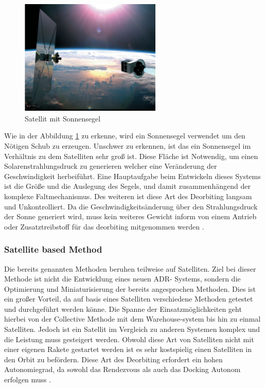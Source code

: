 	\begin{figure}[h]
			\centering
					\includegraphics[width=0.60\textwidth]{./graphics/ADR/Sonnensegel.PNG}
				\caption{Satellit mit Sonnensegel \cite{Romagnoli.2012}}
				\label{fig:Segel}
			\end{figure}

	
Wie in der Abbildung \ref{fig:Segel} zu erkenne, wird ein Sonnensegel verwendet um den Nötigen Schub zu erzeugen. Unschwer zu erkennen, ist das ein Sonnensegel im Verhältnis zu dem Satelliten sehr groß ist. Diese Fläche ist Notwendig, um einen Solarenstrahlungsdruck zu generieren welcher eine Veränderung der Geschwindigkeit herbeiführt. Eine Hauptaufgabe beim Entwickeln dieses Systems ist die Größe und die Auslegung des Segels, und damit zusammenhängend der komplexe Faltmechanismus. Des weiteren ist diese Art des Deorbiting langsam und Unkontrolliert. Da die Geschwindigkeitsänderung über den Strahlungsdruck der Sonne generiert wird, muss kein weiteres Gewicht inform von einem Antrieb oder Zusatztreibstoff für das deorbiting mitgenommen werden \cite{Romagnoli.2012,Mark.2019}.

\subsubsection{Satellite based Method}
	
	Die bereits genannten Methoden beruhen teilweise auf Satelliten. Ziel bei dieser Methode ist nicht die Entwicklung eines neuen ADR- Systems, sondern die Optimierung und Miniaturisierung der bereits angesprochen Methoden. Dies ist ein großer Vorteil, da auf basis eines Satelliten verschiedene Methoden getestet und durchgeführt werden könne. Die Spanne der Einsatzmöglichkeiten geht hierbei von der Collective Methode mit dem Warehouse-system bis hin zu einmal Satelliten. Jedoch ist ein Satellit im Vergleich zu anderen Systemen komplex und die Leistung muss gesteigert werden. Obwohl diese Art von Satelliten nicht mit einer eigenen Rakete gestartet werden ist es sehr kostspielig einen Satelliten in den Orbit zu befördern. Diese Art des Deorbiting erfordert ein hohen Autonomiegrad, da sowohl das Rendezvous als auch das Docking Autonom erfolgen muss \cite{Mark.2019}.

